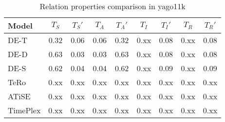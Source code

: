 \begin{table*}[htb]
\centering
\begin{minipage}{0.95\textwidth}
\centering
\caption{Relation properties comparison in yago11k}
\vspace{-3mm}

\begin{tabular}{l|cc|cc|cc|cc}\hline
Model       & $T_S$ & $T_S'$ & $T_A$ & $T_A'$ & $T_I$ & $T_I'$ & $T_R$ & $T_R'$ \\ \hline
DE-T & 0.32 & 0.06 & 0.06 & 0.32 & 0.xx & 0.08 & 0.xx & 0.08 \\ 
DE-D & 0.63 & 0.03 & 0.03 & 0.63 & 0.xx & 0.08 & 0.xx & 0.08 \\ 
DE-S & 0.62 & 0.04 & 0.04 & 0.62 & 0.xx & 0.09 & 0.xx & 0.09 \\ 
TeRo & 0.xx & 0.xx & 0.xx & 0.xx & 0.xx & 0.xx & 0.xx & 0.xx \\ 
ATiSE & 0.xx & 0.xx & 0.xx & 0.xx & 0.xx & 0.xx & 0.xx & 0.xx \\ 
TimePlex & 0.xx & 0.xx & 0.xx & 0.xx & 0.xx & 0.xx & 0.xx & 0.xx \\ 
 \hline
\end{tabular}

\label{fig:relation_properties_yago11k_comparison}
\end{minipage}
\end{table*}

